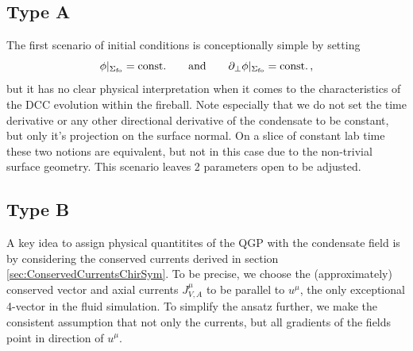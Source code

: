 \subsection{Type A}

The first scenario of initial conditions is conceptionally simple by setting
\begin{equation}
    \phi\vert_{\Sigma_{\text{fo}}}={\text{const.}}\qquad\text{and}\qquad\partial_\perp\phi\vert_{\Sigma_{\text{fo}}}={\text{const.}}\,,
\end{equation}
but it has no clear physical interpretation when it comes to the characteristics of the DCC evolution within the fireball. Note especially that we do not set the time derivative or any other directional derivative of the condensate to be constant, but only it's projection on the surface normal. On a slice of constant lab time these two notions are equivalent, but not in this case due to the non-trivial surface geometry. This scenario leaves 2 parameters open to be adjusted.

\subsection{Type B}

A key idea to assign physical quantitites of the QGP with the condensate field is by considering the conserved currents derived in section \ref{sec:ConservedCurrentsChirSym}. To be precise, we choose the (approximately) conserved vector and axial currents $J^\mu_{V,A}$ to be parallel to $u^\mu$, the only exceptional 4-vector in the fluid simulation. To simplify the ansatz further, we make the consistent assumption that not only the currents, but all gradients of the fields point in direction of $u^\mu$.

